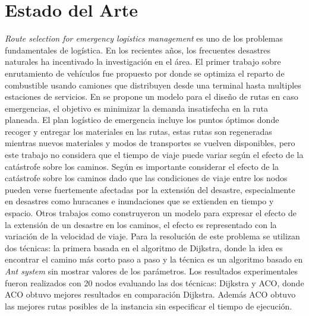 \section{Estado del Arte}


\textit{Route selection for emergency logistics management} es uno de los problemas fundamentales de logística. En los recientes años, los frecuentes desastres naturales ha incentivado la investigación en el área. El primer trabajo sobre enrutamiento de vehículos fue propuesto por \cite{dantzig1959truck} donde se optimiza el reparto de combustible usando camiones que distribuyen desde una terminal hasta multiples estaciones de servicios. En \cite{ozdamar2004emergency} se propone un modelo para el diseño de rutas en caso emergencias, el objetivo es minimizar la demanda insatisfecha en la ruta planeada. El plan logístico de emergencia incluye los puntos óptimos donde recoger y entregar los materiales en las rutas, estas rutas son regeneradas mientras nuevos materiales y modos de transportes se vuelven disponibles, pero este trabajo no considera que el tiempo de viaje puede variar según el efecto de la catástrofe sobre los caminos.
Según \cite{farahmand1997application,tufekci1995integrated} es importante considerar el efecto de la catástrofe sobre los caminos dado que las condiciones de viaje entre los nodos pueden verse fuertemente afectadas por la extensión del desastre, especialmente en desastres como huracanes e inundaciones que se extienden en tiempo y espacio. Otros trabajos como \cite{Yuan20091081} construyeron un modelo para expresar el efecto de la extensión de un desastre en los caminos, el efecto es representado con la variación de la velocidad de viaje. Para la resolución de este problema se utilizan dos técnicas: la primera basada en el algoritmo de Dijkstra, donde la idea es encontrar el camino más corto paso a paso y la técnica es un algoritmo basado en \textit{Ant system} sin mostrar valores de los parámetros. Los resultados experimentales fueron realizados con 20 nodos evaluando las dos técnicas: Dijkstra y ACO, donde ACO obtuvo mejores resultados en comparación Dijkstra. Además ACO obtuvo las mejores rutas posibles de la instancia sin especificar el tiempo de ejecución.\\
